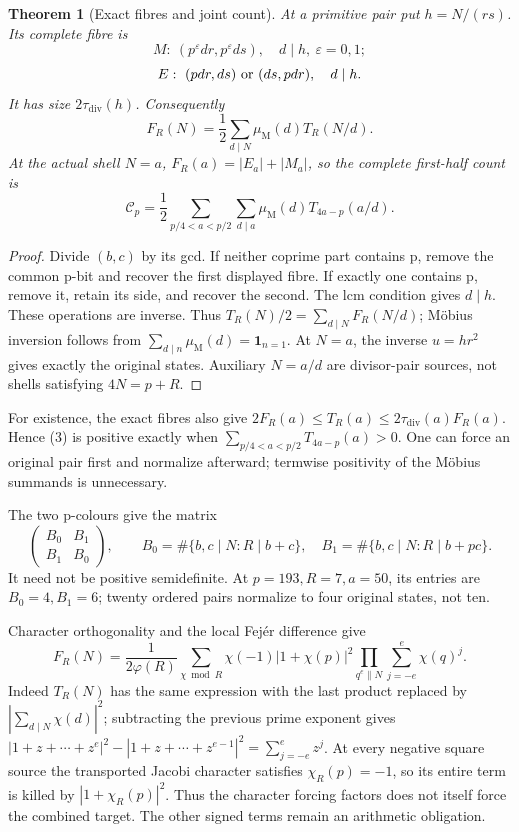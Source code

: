 \documentclass[11pt,reqno]{amsart}
\newtheorem{theorem}{Theorem}\newtheorem{proposition}[theorem]{Proposition}
\begin{document}
\begin{theorem}[Exact fibres and joint count]
At a primitive pair put $h=N/(rs)$. Its complete fibre is
\[
 M:\ (p^\varepsilon dr,p^\varepsilon ds),\quad d\mid h,\ \varepsilon=0,1;
\]
\[
 E:\ (pdr,ds)\ \hbox{or}\ (ds,pdr),\quad d\mid h.
\]
It has size $2\tau_{\mathrm{div}}(h)$. Consequently
\[
 \boxed{F_R(N)=\frac12\sum_{d\mid N}\mu_{\mathrm M}(d)T_R(N/d).}      \tag{2}
\]
At the actual shell $N=a$, $F_R(a)=|E_a|+|M_a|$, so the complete first-half count is
\[
 \boxed{\mathcal C_p=\frac12\sum_{p/4<a<p/2}\sum_{d\mid a}
 \mu_{\mathrm M}(d)T_{4a-p}(a/d).}                                   \tag{3}
\]
\end{theorem}
\begin{proof}
Divide $(b,c)$ by its gcd. If neither coprime part contains p, remove the common
p-bit and recover the first displayed fibre. If exactly one contains p, remove
it, retain its side, and recover the second. The lcm condition gives $d\mid h$.
These operations are inverse. Thus $T_R(N)/2=\sum_{d\mid N}F_R(N/d)$;
M\"obius inversion follows from $\sum_{d\mid n}\mu_{\mathrm M}(d)=\mathbf1_{n=1}$.
At $N=a$, the inverse $u=hr^2$ gives exactly the original states. Auxiliary
$N=a/d$ are divisor-pair sources, not shells satisfying $4N=p+R$.
\end{proof}

For existence, the exact fibres also give
$2F_R(a)\le T_R(a)\le2\tau_{\mathrm{div}}(a)F_R(a)$. Hence (3) is positive exactly when
$\sum_{p/4<a<p/2}T_{4a-p}(a)>0$. One can force an original pair first and
normalize afterward; termwise positivity of the M\"obius summands is unnecessary.

The two p-colours give the matrix
\[
 \begin{pmatrix}B_0&B_1\\B_1&B_0\end{pmatrix},\qquad
 B_0=\#\{b,c\mid N:R\mid b+c\},\quad B_1=\#\{b,c\mid N:R\mid b+pc\}.
\]
It need not be positive semidefinite. At $p=193,R=7,a=50$, its entries are
$B_0=4,B_1=6$; twenty ordered pairs normalize to four original states, not ten.

Character orthogonality and the local Fej\'er difference give
\[
 F_R(N)=\frac1{2\varphi(R)}\sum_{\chi\bmod R}
 \chi(-1)|1+\chi(p)|^2
 \prod_{q^e\parallel N}\sum_{j=-e}^e\chi(q)^j.             \tag{4}
\]
Indeed $T_R(N)$ has the same expression with the last product replaced by
$|\sum_{d\mid N}\chi(d)|^2$; subtracting the previous prime exponent gives
$|1+z+\cdots+z^e|^2-|1+z+\cdots+z^{e-1}|^2=\sum_{j=-e}^ez^j$.
At every negative square source the transported Jacobi character satisfies
$\chi_R(p)=-1$, so its entire term is killed by $|1+\chi_R(p)|^2$.
Thus the character forcing factors does not itself force the combined target.
The other signed terms remain an arithmetic obligation.
\end{document}
